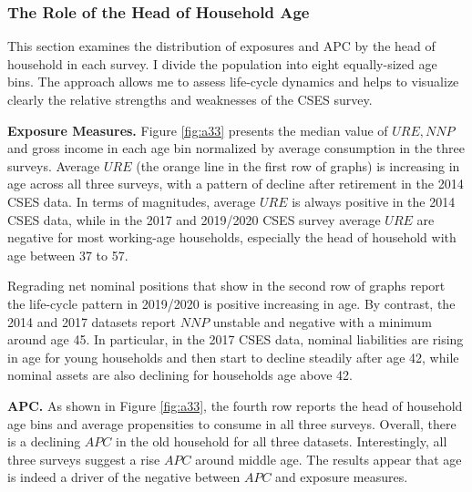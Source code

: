 \documentclass[11pt,letterpaper]{article}
\begin{document}
	\subsubsection{The Role of the Head of Household Age}	
	
	This section examines the distribution of exposures and APC by the head of household in each survey.  I divide the population into eight equally-sized age bins. The approach allows me to assess life-cycle dynamics and helps to visualize clearly the relative strengths and weaknesses of the CSES survey. 
	\vspace{1em}
	
	\noindent\textbf{Exposure Measures.} Figure \ref{fig:a33} presents the median value of $URE, NNP$ and gross income in each age bin normalized by average consumption in the three surveys. Average $URE$ (the orange line in the first row of graphs) is increasing in age across all three surveys, with a pattern of decline after retirement in the 2014 CSES data. In terms of magnitudes, average $URE$ is always positive in the 2014 CSES data, while in the 2017 and 2019/2020 CSES survey average $URE$ are negative for most working-age households, especially the head of household with age between 37 to 57. 
	
	Regrading net nominal positions that show in the second row of graphs report the life-cycle pattern in 2019/2020 is positive increasing in age. By contrast, the 2014 and 2017 datasets report $NNP$ unstable and negative with a minimum around age 45. In particular, in the 2017 CSES data, nominal liabilities are rising in age for young households and then start to decline steadily after age 42, while nominal assets are also declining for households age above 42.     
	\vspace{1em}
	
	\noindent\textbf{APC.} As shown in Figure \ref{fig:a33}, the fourth row reports the head of household age bins and average propensities to consume in all three surveys. Overall, there is a declining $APC$ in the old household for all three datasets. Interestingly, all three surveys suggest a rise $APC$ around middle age. The results appear that age is indeed a driver of the negative between $APC$ and exposure measures. 
	
\end{document}
